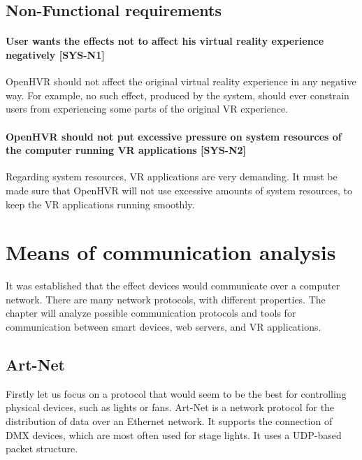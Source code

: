 \hypertarget{x-non-functional-requirements}{\subsection{Non-Functional requirements}}
\hypertarget{x-\textbf{user-wants-the-effects-not-to-affect-his-virtual-reality-experience-negatively}-[sys-n1]}{\paragraph*{\textbf{User wants the effects not to affect his virtual reality experience negatively} [SYS-N1]}}
OpenHVR should not affect the original virtual reality experience in any
negative way. For example, no such effect, produced by the system, should ever
constrain users from experiencing some parts of the original VR experience.


\hypertarget{x-\textbf{openhvr-should-not-put-excessive-pressure-on-system-resources-of-the-computer-running-vr-applications}-[sys-n2]}{\paragraph*{\textbf{OpenHVR should not put excessive pressure on system resources of the computer running VR applications} [SYS-N2]}}
Regarding system resources, VR applications are very demanding. It must be
made sure that OpenHVR will not use excessive amounts of system resources,
to keep the VR applications running smoothly.


\hypertarget{x-means-of-communication-analysis}{\section{Means of communication analysis}}
It was established that the effect devices would communicate over a computer network.
There are many network protocols, with different properties. The chapter will
analyze possible communication protocols and tools for communication
between smart devices, web servers, and VR applications.


\hypertarget{x-art-net}{\subsection{Art-Net}}
Firstly let us focus on a protocol that would seem to be the best for controlling
physical devices, such as lights or fans. Art-Net is a network protocol for
the distribution of data over an Ethernet network. It supports the connection of DMX
devices, which are most often used for stage lights. It uses a UDP-based packet
structure. \cite{artnet}


